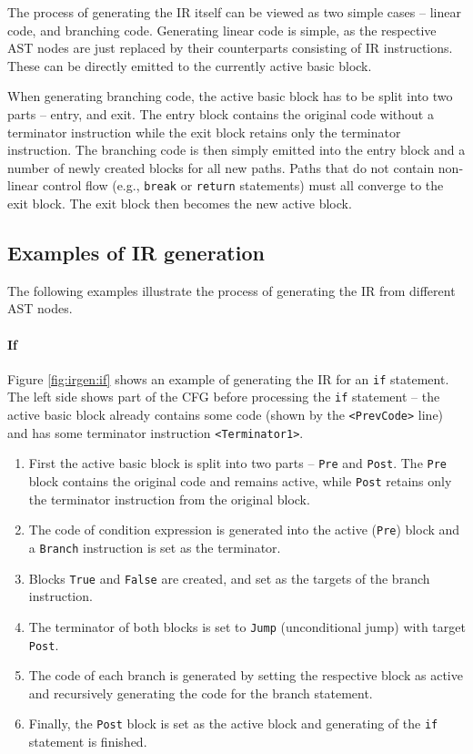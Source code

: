 The process of generating the IR itself can be viewed as two simple cases -- linear code, and branching code. Generating linear code is simple, as the respective AST nodes are just replaced by their counterparts consisting of IR instructions. These can be directly emitted to the currently active basic block.

When generating branching code, the active basic block has to be split into two parts -- entry, and exit. The entry block contains the original code without a terminator instruction while the exit block retains only the terminator instruction. The branching code is then simply emitted into the entry block and a number of newly created blocks for all new paths. Paths that do not contain non-linear control flow (e.g., \texttt{break} or \texttt{return} statements) must all converge to the exit block. The exit block then becomes the new active block.


\subsection{Examples of IR generation}

The following examples illustrate the process of generating the IR from different AST nodes.

\paragraph{If} Figure \ref{fig:irgen:if} shows an example of generating the IR for an \texttt{if} statement. The left side shows part of the CFG before processing the \texttt{if} statement -- the active basic block already contains some code (shown by the \texttt{<PrevCode>} line) and has some terminator instruction \texttt{<Terminator1>}.


\begin{enumerate}[noitemsep]
    \item First the active basic block is split into two parts -- \texttt{Pre} and \texttt{Post}. The \texttt{Pre} block contains the original code and remains active, while \texttt{Post} retains only the terminator instruction from the original block.
    \item The code of condition expression is generated into the active (\texttt{Pre}) block and a \texttt{Branch} instruction is set as the terminator.
    \item Blocks \texttt{True} and \texttt{False} are created, and set as the targets of the branch instruction.
    \item The terminator of both blocks is set to \texttt{Jump} (unconditional jump) with target \texttt{Post}.
    \item The code of each branch is generated by setting the respective block as active and recursively generating the code for the branch statement.
    \item Finally, the \texttt{Post} block is set as the active block and generating of the \texttt{if} statement is finished.
\end{enumerate}

